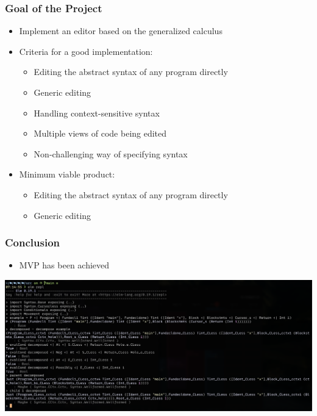 \documentclass[t,24pt,aspectratio=169]{beamer}
\begin{document}
\begin{frame}[hvid]
    \frametitle{Goal of the Project}
    \begin{itemize}
        \item Implement an editor based on the generalized calculus
        \item Criteria for a good implementation:
              \begin{itemize}
                  \pause
                  \item Editing the abstract syntax of any program directly
                        \pause
                  \item Generic editing
                        \pause
                  \item Handling context-sensitive syntax
                        \pause
                  \item Multiple views of code being edited
                        \pause
                  \item Non-challenging way of specifying syntax
              \end{itemize}
              \pause
        \item Minimum viable product:
              \begin{itemize}
                  \pause
                  \item Editing the abstract syntax of any program directly
                        \pause
                  \item Generic editing
              \end{itemize}

    \end{itemize}
\end{frame}

\begin{frame}[hvid]
    \frametitle{Conclusion}
    \begin{itemize}
        \item MVP has been achieved
    \end{itemize}
    \includegraphics[width=\textwidth]{img/repl-editor.png}
\end{frame}
\end{document}
